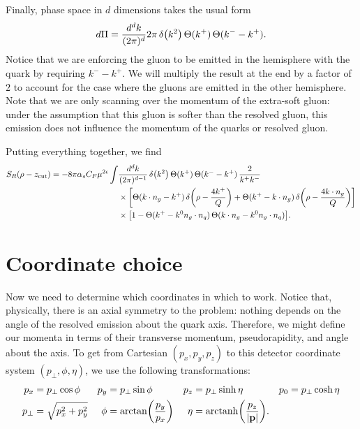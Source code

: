 \documentclass[11pt,twoside,reqno]{amsart}
\theoremstyle{plain}
\theoremstyle{remark}
\theoremstyle{definition}
\theoremstyle{remark}
\theoremstyle{definition}
\theoremstyle{definition}
\newcommand{\zcut}{z_\mathrm{cut}}
\newcommand{\arctanh}{\mathrm{arctanh}}
\begin{document}
	Finally, phase space in $d$ dimensions takes the usual form
	\begin{equation}
		d\Pi = \frac{d^d k}{(2\pi)^d} 2\pi\,\delta\qty(k^2)\,\Theta(k^+)\,\Theta(k^- - k^+).
	\end{equation}
	Notice that we are enforcing the gluon to be emitted in the hemisphere with the quark by requiring $k^- - k^+$. We will multiply the result at the end by a factor of $2$ to account for the case where the gluons are emitted in the other hemisphere. Note that we are only scanning over the momentum of the extra-soft gluon: under the assumption that this gluon is softer than the resolved gluon, this emission does not influence the momentum of the quarks or resolved gluon.

	Putting everything together, we find
	\begin{equation}\label{eq:soft integral}
	\begin{aligned}
		S_R(\rho - \zcut) = -8\pi\alpha_s C_F \mu^{2\epsilon} \int& \frac{d^d k}{(2\pi)^{d-1}} \, \delta\qty(k^2)\,\Theta(k^+)\,\Theta(k^- - k^+) \,\frac{2}{k^+ k^-} \\
		&\times \qty[\Theta(k\cdot n_g - k^+)\,\delta\qty(\rho - \frac{4k^+}{Q}) + \Theta(k^+ - k\cdot n_g)\,\delta\qty(\rho - \frac{4k\cdot n_g}{Q})] \\
		&\times \qty[1 - \Theta(k^+ - k^0 n_g \cdot n_q)\,\Theta(k \cdot n_g - k^0 n_g \cdot n_q)].
	\end{aligned}
	\end{equation}

\section{Coordinate choice}
	Now we need to determine which coordinates in which to work. Notice that, physically, there is an axial symmetry to the problem: nothing depends on the angle of the resolved emission about the quark axis. Therefore, we might define our momenta in terms of their transverse momentum, pseudorapidity, and angle about the axis. To get from Cartesian $(p_x, p_y, p_z)$ to this detector coordinate system $(p_\perp, \phi, \eta)$, we use the following transformations:
	\begin{equation}
	\begin{aligned}
		p_x &= p_\perp \cos\phi & p_y &= p_\perp \sin\phi & p_z &= p_\perp \sinh\eta & p_0 &= p_\perp \cosh\eta \\
		p_\perp &= \sqrt{p_x^2 + p_y^2} & \phi &= \arctan(\frac{p_y}{p_x}) & \eta &= \arctanh\qty(\frac{p_z}{\abs{\vb{p}}}).
	\end{aligned}
	\end{equation}
\end{document}

